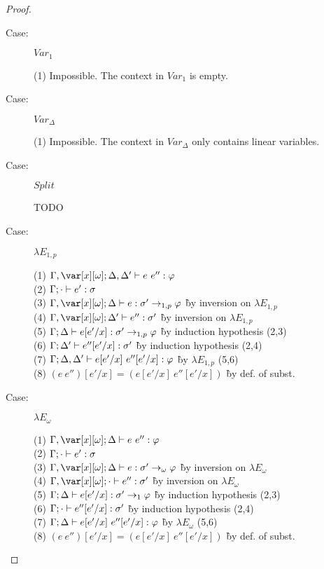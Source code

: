 \begin{proof}
\begin{description}
\item[Case:] $Var_1$
\begin{tabbing}
  (1) Impossible. The context in $Var_1$ is empty.
\end{tabbing}

\item[Case:] $Var_\Delta$
\begin{tabbing}
  (1) Impossible. The context in $Var_\Delta$ only contains linear variables.
\end{tabbing}

\item[Case:] $Split$
\begin{tabbing}
    TODO
\end{tabbing}

\item[Case:] $\lambda E_{1,p}$
\begin{tabbing}
  (1) $\G, \xo; \D,\D' \vdash e~e'' : \vp$\\
  (2) $\Gamma; \cdot \vdash e' : \sigma$\\
  (3) $\G, \xo; \D \vdash e : \s'\to_{1,p}\vp$ \` by inversion on $\lambda E_{1,p}$\\
  (4) $\G, \xo; \D' \vdash e'' : \s'$ \` by inversion on $\lambda E_{1,p}$\\
  (5) $\Gamma; \Delta \vdash e[e'/x] : \sigma'\to_{1,p}\varphi$ \` by induction hypothesis (2,3)\\
  (6) $\Gamma; \Delta' \vdash e''[e'/x] : \sigma'$ \` by induction hypothesis (2,4)\\
  (7) $\Gamma; \Delta, \Delta' \vdash e[e'/x]~e''[e'/x] : \varphi$ \` by $\lambda E_{1,p}$ (5,6)\\
  (8) $(e~e'')[e'/x] = (e[e'/x]~e''[e'/x])$ \` by def. of subst.\\
\end{tabbing}

\item[Case:] $\lambda E_\omega$
\begin{tabbing}
    (1) $\G, \xo; \D \vdash e~e'' : \vp$\\
    (2) $\Gamma; \cdot \vdash e' : \sigma$\\
    (3) $\G, \xo; \D \vdash e : \s'\to_\omega\vp$ \` by inversion on $\lambda E_\omega$\\
    (4) $\G, \xo; \cdot \vdash e'' : \s'$ \` by inversion on $\lambda E_\omega$\\
    (5) $\Gamma; \Delta \vdash e[e'/x] : \sigma'\to_1\varphi$ \` by induction hypothesis (2,3)\\
    (6) $\Gamma; \cdot \vdash e''[e'/x] : \sigma'$ \` by induction hypothesis (2,4)\\
    (7) $\Gamma; \Delta \vdash e[e'/x]~e''[e'/x] : \varphi$ \` by $\lambda E_\omega$ (5,6)\\
    (8) $(e~e'')[e'/x] = (e[e'/x]~e''[e'/x])$ \` by def. of subst.\\
\end{tabbing}


\end{description}
\end{proof}
